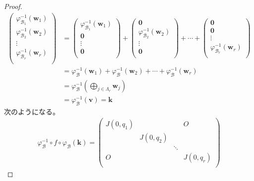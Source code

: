 \documentclass[dvipdfmx]{jsarticle}
\begin{document}
\begin{proof}
\begin{align*}
\begin{pmatrix}
\varphi_{\mathcal{B}_{1}}^{- 1}\left( \mathbf{w}_{1} \right) \\
\varphi_{\mathcal{B}_{2}}^{- 1}\left( \mathbf{w}_{2} \right) \\
 \vdots \\
\varphi_{\mathcal{B}_{r}}^{- 1}\left( \mathbf{w}_{r} \right) \\
\end{pmatrix} &= \begin{pmatrix}
\varphi_{\mathcal{B}_{1}}^{- 1}\left( \mathbf{w}_{1} \right) \\
\mathbf{0} \\
 \vdots \\
\mathbf{0} \\
\end{pmatrix} + \begin{pmatrix}
\mathbf{0} \\
\varphi_{\mathcal{B}_{2}}^{- 1}\left( \mathbf{w}_{2} \right) \\
 \vdots \\
\mathbf{0} \\
\end{pmatrix} + \cdots + \begin{pmatrix}
\mathbf{0} \\
\mathbf{0} \\
 \vdots \\
\varphi_{\mathcal{B}_{r}}^{- 1}\left( \mathbf{w}_{r} \right) \\
\end{pmatrix}\\
&= \varphi_{\mathcal{B}}^{- 1}\left( \mathbf{w}_{1} \right) + \varphi_{\mathcal{B}}^{- 1}\left( \mathbf{w}_{2} \right) + \cdots + \varphi_{\mathcal{B}}^{- 1}\left( \mathbf{w}_{r} \right)\\
&= \varphi_{\mathcal{B}}^{- 1}\left( \bigoplus_{j \in \varLambda_{r}} \mathbf{w}_{j} \right)\\
&= \varphi_{\mathcal{B}}^{- 1}\left( \mathbf{v} \right) = \mathbf{k}
\end{align*}
次のようになる。
\begin{align*}
\varphi_{\mathcal{B}}^{- 1} \circ f \circ \varphi_{\mathcal{B}}\left( \mathbf{k} \right) = \begin{pmatrix}
J\left( 0,q_{1} \right) & \  & \  & O \\
\  & J\left( 0,q_{2} \right) & \  & \  \\
\  & \  & \ddots & \  \\
O & \  & \  & J\left( 0,q_{r} \right) \\

\end{pmatrix}
\end{align*}
\end{proof}
\end{document}

